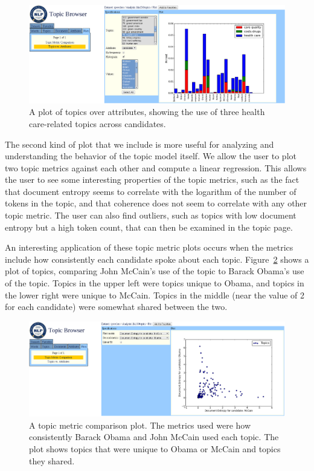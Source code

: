 \documentclass{article}
\begin{document}
\begin{figure}
  \centering
  \includegraphics[width=\textwidth]{trend_plot}
  \caption{A plot of topics over attributes, showing the use of three health
  care-related topics across candidates.}
  \label{fig:trend-plot}
\end{figure}

The second kind of plot that we include is more useful for analyzing and
understanding the behavior of the topic model itself.  We allow the user to
plot two topic metrics against each other and compute a linear regression.
This allows the user to see some interesting properties of the topic metrics,
such as the fact that document entropy seems to correlate with the logarithm of
the number of tokens in the topic, and that coherence does not seem to
correlate with any other topic metric.  The user can also find outliers, such
as topics with low document entropy but a high token count, that can then be
examined in the topic page.

An interesting application of these topic metric plots occurs when the metrics
include how consistently each candidate spoke about each topic.
Figure~\ref{fig:metric-plot} shows a plot of topics, comparing John McCain's
use of the topic to Barack Obama's use of the topic.  Topics in the upper left
were topics unique to Obama, and topics in the lower right were unique to
McCain.  Topics in the middle (near the value of 2 for each candidate) were
somewhat shared between the two.

\begin{figure}
  \centering
  \includegraphics[width=\textwidth]{metric_plot}
  \caption{A topic metric comparison plot.  The metrics used were how
  consistently Barack Obama and John McCain used each topic. The plot shows
  topics that were unique to Obama or McCain and topics they shared.}
  \label{fig:metric-plot}
\end{figure}
\end{document}
